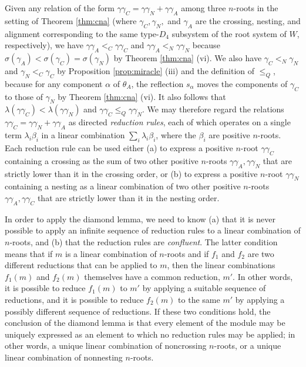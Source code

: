 \documentclass[11pt]{amsart}
\theoremstyle{plain}
\theoremstyle{definition}
\theoremstyle{remark}
\numberwithin{equation}{subsection}
\newcommand{\al}{\alpha}
\begin{document}
Given any relation of the form $\gamma \gamma_C = \gamma \gamma_N + \gamma
\gamma_A$ among three $n$-roots in the setting of Theorem \ref{thm:cna} (where
$\gamma_C, \gamma_N,$ and $\gamma_A$ are the crossing, nesting, and alignment
corresponding to the same type-$D_4$ subsystem of the root system of $W$,
respectively), 
we
have $\gamma\gamma_A<_C\gamma\gamma_C$ and
$\gamma\gamma_A<_N\gamma\gamma_N$ because
$\sigma(\gamma_A)<\sigma(\gamma_C)=\sigma(\gamma_N)$ by Theorem \ref{thm:cna}
(vi). We also have $\gamma_C<_N \gamma_N$ and $\gamma_N <_C \gamma_C$ by
Proposition \ref{prop:miracle} (iii) and the definition of $\le_Q$, because for
any component $\al$ of $\theta_A$, the reflection $s_\al$ moves the components
of $\gamma_C$ to those of $\gamma_N$ by Theorem \ref{thm:cna} (vi).  It also
follows that $\lambda(\gamma\gamma_C)< \lambda(\gamma\gamma_N)$ and
$\gamma\gamma_C \leq_Q \gamma\gamma_N$.  We may therefore regard the relations
$\gamma \gamma_C = \gamma \gamma_N + \gamma \gamma_A$ as directed \emph{reduction
rules}, each of which operates on a single term $\lambda_i \beta_i$ in a linear
combination $\sum_i \lambda_i \beta_i$, where the $\beta_i$ are positive
$n$-roots.  Each reduction rule can be used either (a) to express a positive
$n$-root $\gamma\gamma_C$ containing a crossing as the sum of two other positive
$n$-roots $\gamma\gamma_A, \gamma\gamma_N$ that are strictly lower than it in
the crossing order, or (b) to express a positive $n$-root $\gamma\gamma_N$
containing a nesting as a linear combination of two other positive $n$-roots
$\gamma\gamma_A,\gamma\gamma_C$ that are strictly lower than it in the nesting
order.

In order to apply the diamond lemma, we need to know (a) that it is never
possible to apply an infinite sequence of reduction rules to a linear
combination of $n$-roots, and (b) that the reduction rules are {\it confluent}.
The latter condition means that if $m$ is a linear combination of $n$-roots and
if $f_1$ and $f_2$ are two different reductions that can be applied to $m$, then
the linear combinations $f_1(m)$ and $f_2(m)$ themselves have a common
reduction, $m'$. In other words, it is possible to reduce $f_1(m)$ to $m'$ by
applying a suitable sequence of reductions, and it is possible to reduce
$f_2(m)$ to the same $m'$ by applying a possibly different sequence of
reductions. If these two conditions hold, the conclusion of the diamond lemma is
that every element of the module may be uniquely expressed as an element to
which no reduction rules may be applied; in other words, a unique linear
combination of noncrossing $n$-roots, or a unique linear combination of
nonnesting $n$-roots.
\end{document}
